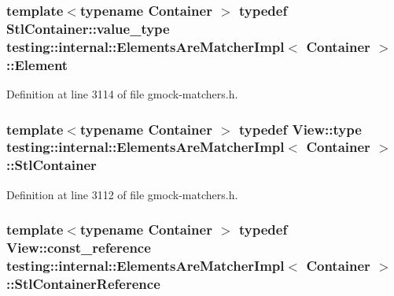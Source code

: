 \subsubsection[{\texorpdfstring{Element}{Element}}]{\setlength{\rightskip}{0pt plus 5cm}template$<$typename Container $>$ typedef Stl\+Container\+::value\+\_\+type {\bf testing\+::internal\+::\+Elements\+Are\+Matcher\+Impl}$<$ Container $>$\+::{\bf Element}}\hypertarget{classtesting_1_1internal_1_1_elements_are_matcher_impl_ab2ae88256ac950b69cd2af67b9820c87}{}\label{classtesting_1_1internal_1_1_elements_are_matcher_impl_ab2ae88256ac950b69cd2af67b9820c87}


Definition at line 3114 of file gmock-\/matchers.\+h.

\subsubsection[{\texorpdfstring{Stl\+Container}{StlContainer}}]{\setlength{\rightskip}{0pt plus 5cm}template$<$typename Container $>$ typedef {\bf View\+::type} {\bf testing\+::internal\+::\+Elements\+Are\+Matcher\+Impl}$<$ Container $>$\+::{\bf Stl\+Container}}\hypertarget{classtesting_1_1internal_1_1_elements_are_matcher_impl_a5897abb9a1dcf88afe04e14986ebe46f}{}\label{classtesting_1_1internal_1_1_elements_are_matcher_impl_a5897abb9a1dcf88afe04e14986ebe46f}


Definition at line 3112 of file gmock-\/matchers.\+h.

\subsubsection[{\texorpdfstring{Stl\+Container\+Reference}{StlContainerReference}}]{\setlength{\rightskip}{0pt plus 5cm}template$<$typename Container $>$ typedef {\bf View\+::const\+\_\+reference} {\bf testing\+::internal\+::\+Elements\+Are\+Matcher\+Impl}$<$ Container $>$\+::{\bf Stl\+Container\+Reference}}\hypertarget{classtesting_1_1internal_1_1_elements_are_matcher_impl_ad5d20c1aa6e8c06c82fe3ac4d68c2278}{}\label{classtesting_1_1internal_1_1_elements_are_matcher_impl_ad5d20c1aa6e8c06c82fe3ac4d68c2278}


